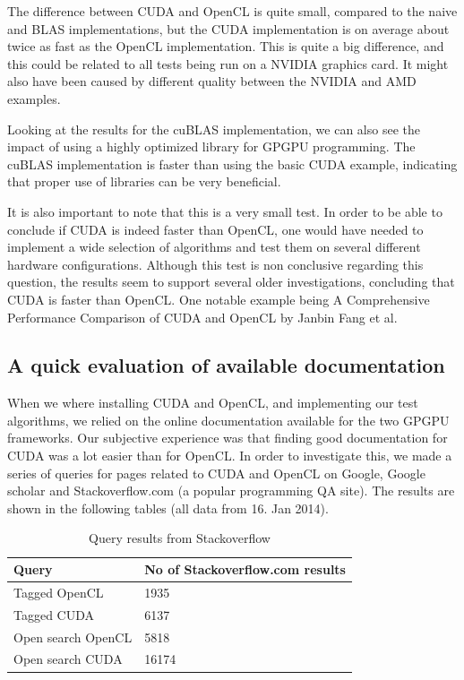 The difference between CUDA and OpenCL is quite small, compared to the naive and BLAS implementations, but the CUDA implementation is on average about twice as fast as the OpenCL implementation. This is quite a big difference, and this could be related to all tests being run on a NVIDIA graphics card. It might also have been caused by different quality between the NVIDIA and AMD examples.

Looking at the results for the cuBLAS implementation, we can also see the impact of using a highly optimized library for GPGPU programming. The cuBLAS implementation is faster than using the basic CUDA example, indicating that proper use of libraries can be very beneficial.

It is also important to note that this is a very small test. In order to be able to conclude if CUDA is indeed faster than OpenCL, one would have needed to implement a wide selection of algorithms and test them on several different hardware configurations. Although this test is non conclusive regarding this question, the results seem to support several older investigations, concluding that CUDA is faster than OpenCL\@. One notable example being A Comprehensive Performance Comparison of
CUDA and OpenCL\cite{Fang11} by Janbin Fang et al.

\subsection{A quick evaluation of available documentation} %
\label{sub:a_quick_evaluation_of_available_documentation}

When we where installing CUDA and OpenCL, and implementing our test algorithms, we relied on the online documentation available for the two GPGPU frameworks. Our subjective experience was that finding good documentation for CUDA was a lot easier than for OpenCL\@. In order to investigate this, we made a series of queries for pages related to CUDA and OpenCL on Google, Google scholar and Stackoverflow.com (a popular programming QA site). The results are shown in the following tables (all data from 16. Jan 2014).

\begin{table}[ht]
\centering
    \begin{tabular}{ | l | l |}
    \hline
    \textbf{Query}     & \textbf{No of Stackoverflow.com results}    \\ \hline
    Tagged OpenCL      & 1935                                        \\ \hline
    Tagged CUDA        & 6137                                        \\ \hline
    Open search OpenCL & 5818                                        \\ \hline
    Open search CUDA   & 16174                                       \\ \hline
    \end{tabular}
    \caption{Query results from Stackoverflow}
    \label{fig:stackoverflow-terms-results}
\end{table}

